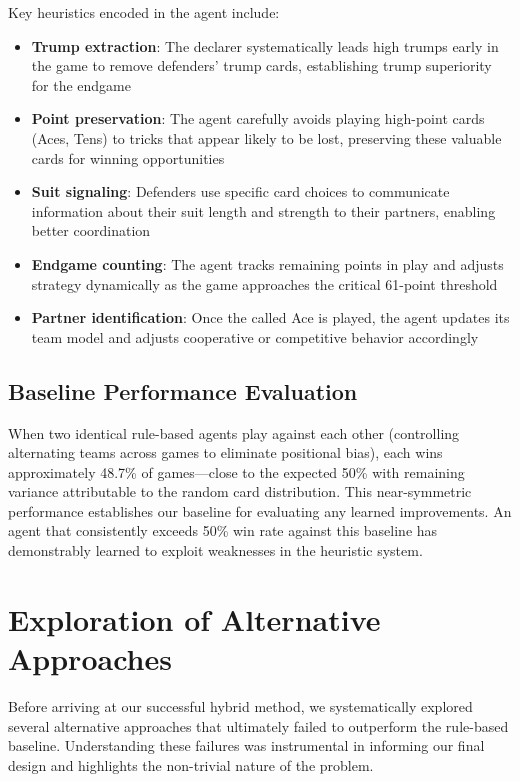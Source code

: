 \documentclass[conference]{IEEEtran}
\begin{document}
Key heuristics encoded in the agent include:
\begin{itemize}
    \item \textbf{Trump extraction}: The declarer systematically leads high trumps early in the game to remove defenders' trump cards, establishing trump superiority for the endgame
    \item \textbf{Point preservation}: The agent carefully avoids playing high-point cards (Aces, Tens) to tricks that appear likely to be lost, preserving these valuable cards for winning opportunities
    \item \textbf{Suit signaling}: Defenders use specific card choices to communicate information about their suit length and strength to their partners, enabling better coordination
    \item \textbf{Endgame counting}: The agent tracks remaining points in play and adjusts strategy dynamically as the game approaches the critical 61-point threshold
    \item \textbf{Partner identification}: Once the called Ace is played, the agent updates its team model and adjusts cooperative or competitive behavior accordingly
\end{itemize}

\subsection{Baseline Performance Evaluation}

When two identical rule-based agents play against each other (controlling alternating teams across games to eliminate positional bias), each wins approximately 48.7\% of games—close to the expected 50\% with remaining variance attributable to the random card distribution. This near-symmetric performance establishes our baseline for evaluating any learned improvements. An agent that consistently exceeds 50\% win rate against this baseline has demonstrably learned to exploit weaknesses in the heuristic system.

\section{Exploration of Alternative Approaches}

Before arriving at our successful hybrid method, we systematically explored several alternative approaches that ultimately failed to outperform the rule-based baseline. Understanding these failures was instrumental in informing our final design and highlights the non-trivial nature of the problem.
\end{document}
